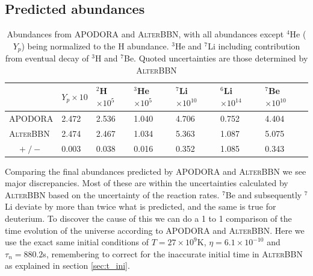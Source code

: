 \subsection{Predicted abundances}
\begin{table}[ht]
    \begin{tabular}{l|llllll}
        & $Y_p \times 10$ & \hspace{-0.34em}$^{2}$H$ \times 10^{5}$ & \hspace{-0.34em}$^{3}$He$ \times 10^{5}$ & \hspace{-0.34em}$^{7}$Li $ \times 10^{10}$& \hspace{-0.34em}$^{6}$Li $ \times 10^{14}$& \hspace{-0.34em}$^{7}$Be $ \times 10^{10}$\\ \hline
    APODORA & 2.472            & 2.536 & 1.040 & 4.706 & 0.752 & 4.404   \\ \hline
    \textsc{AlterBBN} & 2.474            & 2.467 & 1.034 & 5.363 & 1.087 & 5.075   \\ %
    $\quad +/-$ & 0.003           & 0.038 & 0.016 & 0.352 & 1.085 & 0.343      
    \end{tabular}
    \caption{Abundances from APODORA and \textsc{AlterBBN}, with all abundances except ${}^4$He ($Y_p$) being normalized to the H abundance. ${}^3$He and ${}^7$Li including contribution from eventual decay of ${}^3$H and ${}^7$Be. Quoted uncertainties are those determined by \textsc{AlterBBN}}
    \label{tab:shortAlterabun}
\end{table}
Comparing the final abundances predicted by APODORA and \textsc{AlterBBN} we see major discrepancies. Most of these are within the uncertainties calculated by \textsc{AlterBBN} based on the uncertainty of the reaction rates. ${}^7$Be and subsequently ${}^7$Li deviate by more than twice what is predicted, and the same is true for deuterium. To discover the cause of this we can do a 1 to 1 comparison of the time evolution of the universe according to APODORA and \textsc{AlterBBN}. Here we use the exact same initial conditions of $T=27\times10^9$K, $\eta=6.1\times 10^{-10}$ and $\tau_n=880.2$s, remembering to correct for the inaccurate initial time in \textsc{AlterBBN} as explained in section \ref{sec:t_ini}.

